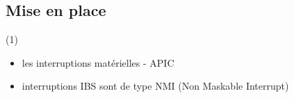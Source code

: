     \subsection{Mise en place}
       \begin{frame}{\secname}{\subsecname(1)}        
	\begin{itemize}
 
	  \item les interruptions matérielles - APIC
	  \item<2-> interruptions IBS sont de type NMI (Non Maskable Interrupt)
	\end{itemize}
       \end{frame}

